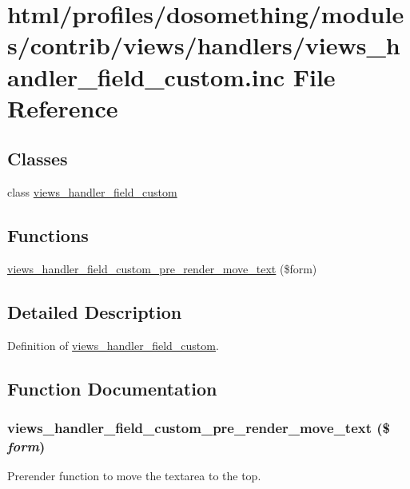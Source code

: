 \hypertarget{views__handler__field__custom_8inc}{
\section{html/profiles/dosomething/modules/contrib/views/handlers/views\_\-handler\_\-field\_\-custom.inc File Reference}
\label{views__handler__field__custom_8inc}
}
\subsection*{Classes}
\begin{DoxyCompactItemize}
\item 
class \hyperlink{classviews__handler__field__custom}{views\_\-handler\_\-field\_\-custom}
\end{DoxyCompactItemize}
\subsection*{Functions}
\begin{DoxyCompactItemize}
\item 
\hyperlink{views__handler__field__custom_8inc_ae6e21c2dc5daca90f5764c3ae7aa9ed0}{views\_\-handler\_\-field\_\-custom\_\-pre\_\-render\_\-move\_\-text} (\$form)
\end{DoxyCompactItemize}


\subsection{Detailed Description}
Definition of \hyperlink{classviews__handler__field__custom}{views\_\-handler\_\-field\_\-custom}. 

\subsection{Function Documentation}
\hypertarget{views__handler__field__custom_8inc_ae6e21c2dc5daca90f5764c3ae7aa9ed0}{
\subsubsection[{views\_\-handler\_\-field\_\-custom\_\-pre\_\-render\_\-move\_\-text}]{\setlength{\rightskip}{0pt plus 5cm}views\_\-handler\_\-field\_\-custom\_\-pre\_\-render\_\-move\_\-text (\$ {\em form})}}
\label{views__handler__field__custom_8inc_ae6e21c2dc5daca90f5764c3ae7aa9ed0}
Prerender function to move the textarea to the top. 